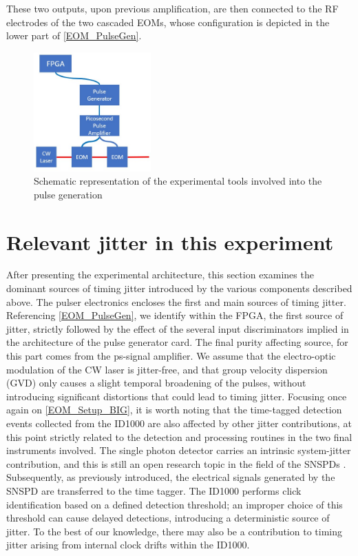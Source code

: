 These two outputs, upon previous amplification, are then connected to the RF electrodes of the two cascaded EOMs, whose configuration is depicted in the lower part of \autoref{EOM_PulseGen}.  

\begin{figure}[hbtp]
\centering
\includegraphics[width=0.4\textwidth]{EOM_Pulse_Sketch.jpg}
\caption{Schematic representation of the experimental tools involved into the pulse generation}
\label{EOM_PulseGen}
\end{figure}

\section{Relevant jitter in this experiment}
\label{sec:Jitter Sources}
After presenting the experimental architecture, this section examines the dominant sources of timing jitter introduced by the various components described above.
The pulser electronics encloses the first and main sources of timing jitter.
Referencing \autoref{EOM_PulseGen}, we identify within the FPGA, the first source of jitter, strictly followed by the effect of the several input discriminators implied in the architecture of the pulse generator card\cite{MioArticle}. The final purity affecting source, for this part comes from the ps-signal amplifier.
We assume that the electro-optic modulation of the CW laser is jitter-free, and that group velocity dispersion (GVD) only causes a slight temporal broadening of the pulses, without introducing significant distortions that could lead to timing jitter.
Focusing once again on \autoref{EOM_Setup_BIG}, it is worth noting that the time-tagged detection events collected from the ID1000 are also affected by other jitter contributions, at this point strictly related to the detection and processing routines in the two final instruments involved.
The single photon detector carries an intrinsic system-jitter contribution, and this is still an open research topic in the field of the SNSPDs \cite{SNSPD_Jit_1, SNSPD_Jit_2}.
Subsequently, as previously introduced, the electrical signals generated by the SNSPD are transferred to the time tagger. The ID1000 performs click identification based on a defined detection threshold; an improper choice of this threshold can cause delayed detections, introducing a deterministic source of jitter.
To the best of our knowledge, there may also be a contribution to timing jitter arising from internal clock drifts within the ID1000.

